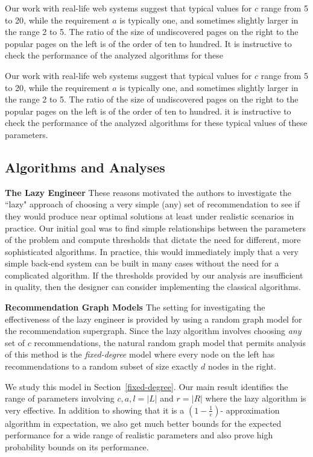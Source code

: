 Our work with real-life web systems suggest that typical values for $c$ range
from 5 to 20, while the requirement $a$ is typically one, and sometimes slightly
larger in the range 2 to 5. The ratio of the size of undiscovered pages on the
right to the popular pages on the left is of the order of ten to hundred. It is
instructive to check the performance of the analyzed algorithms for these

Our work with real-life web systems suggest that typical values for $c$ range
from 5 to 20, while the requirement $a$ is typically one, and sometimes slightly
larger in the range 2 to 5. The ratio of the size of undiscovered pages on the
right to the popular pages on the left is of the order of ten to hundred. it is
instructive to check the performance of the analyzed algorithms for these
typical values of these parameters.

\subsection{Algorithms and Analyses}

{\bf The Lazy Engineer}
These reasons motivated the authors to investigate the ``lazy" approach of
choosing a very simple (any) set of recommendation to see if they would produce
near optimal solutions at least under realistic scenarios in practice. Our
initial goal was to find simple relationships between the parameters of the
problem and compute thresholds that dictate the need for different, more
sophisticated algorithms. In practice, this would immediately imply that a very
simple back-end system can be built in many cases without the need for a
complicated algorithm. If the thresholds provided by our analysis are
insufficient in quality, then the designer can consider implementing the
classical algorithms. \vs

{\bf Recommendation Graph Models}
The setting for investigating the effectiveness of the lazy engineer is provided
by using a random graph model for the recommendation supergraph. Since the lazy
algorithm involves choosing {\em any} set of $c$ recommendations, the natural
random graph model that permits analysis of this method is the {\em fixed-degree}
model where every node on the left has recommendations to a random subset of size
exactly $d$ nodes in the right. 

We study this model in Section~\ref{fixed-degree}. Our main result identifies
the range of parameters involving $c,a,l=|L|$ and $r =|R|$ where the lazy
algorithm is very effective. In addition to showing that it is a $(1-\frac1e)$-
approximation algorithm in expectation, we also get much better bounds for the
expected performance for a wide range of realistic parameters and also prove
high probability bounds on its performance. \vs

